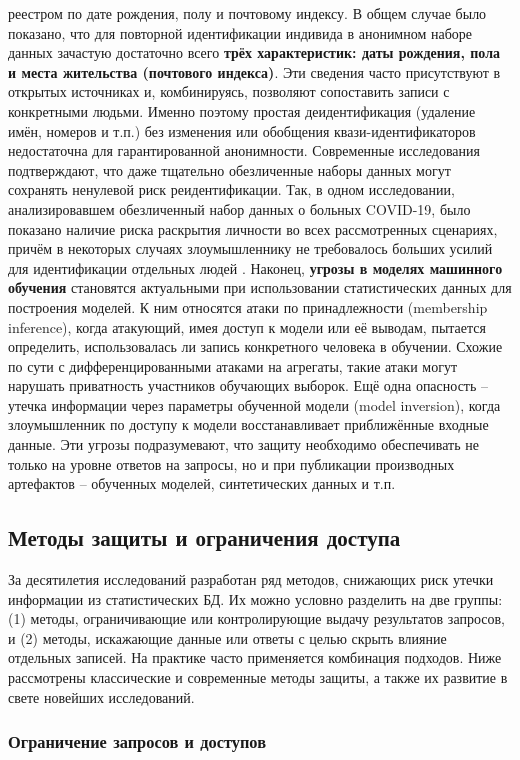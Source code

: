 реестром по дате рождения, полу и почтовому индексу. В общем случае было показано, что для повторной идентификации индивида в анонимном наборе данных зачастую достаточно всего \textbf{трёх характеристик: даты рождения, пола и места жительства (почтового индекса)}.
Эти сведения часто присутствуют в открытых источниках и, комбинируясь, позволяют сопоставить записи с конкретными людьми. Именно поэтому простая деидентификация (удаление имён, номеров и т.п.) без изменения или обобщения квази-идентификаторов недостаточна для гарантированной анонимности. Современные исследования подтверждают, что даже тщательно обезличенные наборы данных могут сохранять ненулевой риск реидентификации. Так, в одном исследовании, анализировавшем обезличенный набор данных о больных COVID-19, было показано наличие риска раскрытия личности во всех рассмотренных сценариях, причём в некоторых случаях злоумышленнику не требовалось больших усилий для идентификации отдельных людей \autocite{journals-plos-org}. Наконец, \textbf{угрозы в моделях машинного обучения} становятся актуальными при использовании статистических данных для построения моделей. К ним относятся атаки по принадлежности (membership inference), когда атакующий, имея доступ к модели или её выводам, пытается определить, использовалась ли запись конкретного человека в обучении. Схожие по сути с дифференцированными атаками на агрегаты, такие атаки могут нарушать приватность участников обучающих выборок. Ещё одна опасность – утечка информации через параметры обученной модели (model inversion), когда злоумышленник по доступу к модели восстанавливает приближённые входные данные. Эти угрозы подразумевают, что защиту необходимо обеспечивать не только на уровне ответов на запросы, но и при публикации производных артефактов – обученных моделей, синтетических данных и т.п. \subsection{Методы защиты и ограничения доступа}
За десятилетия исследований разработан ряд методов, снижающих риск утечки информации из статистических БД. Их можно условно разделить на две группы: (1) методы, ограничивающие или контролирующие выдачу результатов запросов, и (2) методы, искажающие данные или ответы с целью скрыть влияние отдельных записей. На практике часто применяется комбинация подходов. Ниже рассмотрены классические и современные методы защиты, а также их развитие в свете новейших исследований. \subsubsection{Ограничение запросов и доступов}
